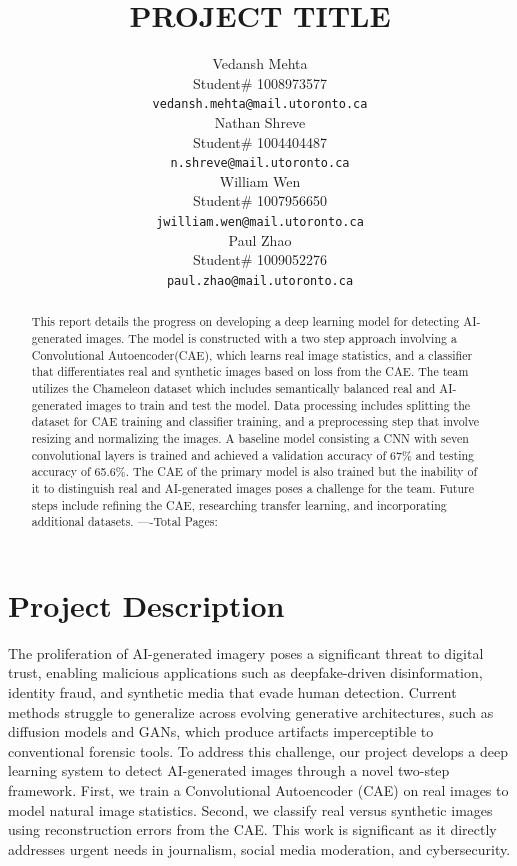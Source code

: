 \documentclass{article} %
\title{PROJECT TITLE}
\author{Vedansh Mehta  \\
Student\# 1008973577 \\
\texttt{vedansh.mehta@mail.utoronto.ca} \\
\And
Nathan Shreve  \\
Student\# 1004404487 \\
\texttt{n.shreve@mail.utoronto.ca} \\
\AND
William Wen  \\
Student\# 1007956650 \\
\texttt{jwilliam.wen@mail.utoronto.ca} \\
\And
Paul Zhao \\
Student\# 1009052276 \\
\texttt{paul.zhao@mail.utoronto.ca} \\
\AND
}
\begin{document}
\maketitle

\begin{abstract}
    This report details the progress on developing a deep learning model for detecting AI-generated images. The model is constructed with a two step approach involving a Convolutional Autoencoder(CAE), which learns real image statistics, and a classifier that differentiates real and synthetic images based on loss from the CAE. The team utilizes the Chameleon dataset which includes semantically balanced real and AI-generated images to train and test the model. Data processing includes splitting the dataset for CAE training and classifier training, and a preprocessing step that involve resizing and normalizing the images. A baseline model consisting a CNN with seven convolutional layers is trained and achieved a validation accuracy of 67\% and testing accuracy of 65.6\%. The CAE of the primary model is also trained but the inability of it to distinguish real and AI-generated images poses a challenge for the team. Future steps include refining the CAE, researching transfer learning, and incorporating additional datasets.
    ----Total Pages: \pageref{last_page}
\end{abstract}



\section{Project Description}

The proliferation of AI-generated imagery poses a significant threat to digital trust, enabling malicious applications such as deepfake-driven disinformation, identity fraud, and synthetic media that evade human detection. Current methods struggle to generalize across evolving generative architectures, such as diffusion models and GANs, which produce artifacts imperceptible to conventional forensic tools. To address this challenge, our project develops a deep learning system to detect AI-generated images through a novel two-step framework. First, we train a Convolutional Autoencoder (CAE) on real images to model natural image statistics. Second, we classify real versus synthetic images using reconstruction errors from the CAE. This work is significant as it directly addresses urgent needs in journalism, social media moderation, and cybersecurity.
\end{document}

